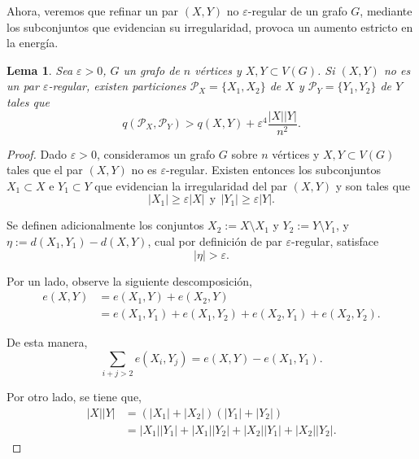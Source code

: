 \documentclass{article}[14pts]
\newtheorem{lema}{Lema}
\let\varepsilon=\varepsilon
\begin{document}
Ahora, veremos que refinar un par $(X,Y)$ no $\varepsilon$-regular de un grafo $G$, mediante los subconjuntos que evidencian su irregularidad, provoca un aumento estricto en la energía.\medskip

\begin{lema} \label{Energy boost un conjunto}
    Sea $\varepsilon > 0$, $G$ un grafo de $n$ vértices y $X,Y\subset V(G)$. Si $(X,Y)$ no es un par $\varepsilon$-regular, existen particiones $\mathcal{P}_{X} = \lbrace X_1, X_2\rbrace$ de $X$ y $\mathcal{P}_{Y} = \lbrace Y_1, Y_2\rbrace$ de $Y$ tales que
    \[
        q(\mathcal{P}_{X}, \mathcal{P}_{Y}) > q(X,Y) + \varepsilon^{4}\frac{|X||Y|}{n^{2}}.
    \]
\end{lema}

\begin{proof}
    Dado $\varepsilon > 0$, consideramos un grafo $G$ sobre $n$ vértices y $X,Y\subset V(G)$ tales que el par $(X,Y)$ no es $\varepsilon$-regular. Existen entonces los subconjuntos $X_1 \subset X$ e $Y_1 \subset Y$ que evidencian la irregularidad del par $(X,Y)$ y son tales que
    \begin{equation} \label{condición tamaño conjunto regularidad}
        |X_1| \geq \varepsilon |X|\ \ \text{y}\ \ |Y_1| \geq \varepsilon |Y|.
    \end{equation}
    
    Se definen adicionalmente los conjuntos $X_2 := X\setminus X_1$ y $Y_2 := Y\setminus Y_1$, y $\eta := d(X_1, Y_1) - d(X,Y)$, cual por definición de par $\varepsilon$-regular, satisface
    \begin{equation} \label{|eta| > epsilon}
        \left| \eta\right| > \varepsilon.
    \end{equation}

    Por un lado, observe la siguiente descomposición,
    \begin{align*}
        e(X,Y) &= e(X_1, Y) + e(X_2, Y)\\
        &= e(X_1, Y_1) + e(X_1, Y_2) + e(X_2, Y_1) + e(X_2, Y_2).
    \end{align*}

    De esta manera,
    \begin{equation} \label{descomposición suma aristas}
        \sum_{i+j>2} e(X_i, Y_j) = e(X,Y) - e(X_1, Y_1).
    \end{equation}

    Por otro lado, se tiene que,
    \begin{align*}
        |X||Y| &= (|X_1| + |X_2|)(|Y_1| + |Y_2|)\\
        &= |X_1||Y_1| + |X_1||Y_2| + |X_2||Y_1| + |X_2||Y_2|.
    \end{align*}


\end{proof}
\end{document}
